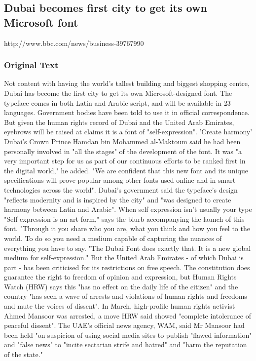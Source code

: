 \subsection{Dubai becomes first city to get its own Microsoft font}
http://www.bbc.com/news/business-39767990
\subsubsection{Original Text}
Not content with having the world's tallest building and biggest shopping centre, Dubai has become the first city to get its own Microsoft-designed font.
The typeface comes in both Latin and Arabic script, and will be available in 23 languages.
Government bodies have been told to use it in official correspondence.
But given the human rights record of Dubai and the United Arab Emirates, eyebrows will be raised at claims it is a font of "self-expression".
'Create harmony'
Dubai's Crown Prince Hamdan bin Mohammed al-Maktoum said he had been personally involved in "all the stages" of the development of the font.
It was "a very important step for us as part of our continuous efforts to be ranked first in the digital world," he added.
"We are confident that this new font and its unique specifications will prove popular among other fonts used online and in smart technologies across the world".
Dubai's government said the typeface's design "reflects modernity and is inspired by the city" and "was designed to create harmony between Latin and Arabic".
When self expression isn't usually your type
"Self-expression is an art form," says the blurb accompanying the launch of this font.
"Through it you share who you are, what you think and how you feel to the world. To do so you need a medium capable of capturing the nuances of everything you have to say.
"The Dubai Font does exactly that. It is a new global medium for self-expression."
But the United Arab Emirates - of which Dubai is part - has been criticised for its restrictions on free speech.
The constitution does guarantee the right to freedom of opinion and expression, but Human Rights Watch (HRW) says this "has no effect on the daily life of the citizen" and the country "has seen a wave of arrests and violations of human rights and freedoms and mute the voices of dissent".
In March, high-profile human rights activist Ahmed Mansoor was arrested, a move HRW said showed "complete intolerance of peaceful dissent".
The UAE's official news agency, WAM, said Mr Mansoor had been held "on suspicion of using social media sites to publish "flawed information" and "false news" to "incite sectarian strife and hatred" and "harm the reputation of the state."


